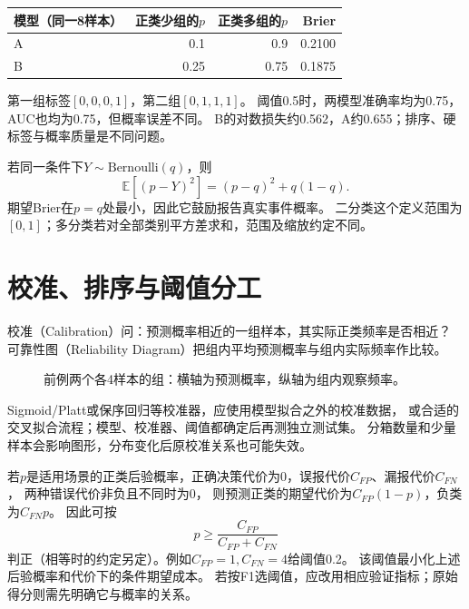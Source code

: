 \begin{center}
\begin{tabular}{lrrr}
\toprule
模型（同一8样本） & 正类少组的$p$ & 正类多组的$p$ & Brier\\
\midrule
A & 0.1 & 0.9 & 0.2100\\
B & 0.25 & 0.75 & 0.1875\\
\bottomrule
\end{tabular}
\end{center}
第一组标签$[0,0,0,1]$，第二组$[0,1,1,1]$。
阈值0.5时，两模型准确率均为0.75，AUC也均为0.75，但概率误差不同。
B的对数损失约0.562，A约0.655；排序、硬标签与概率质量是不同问题。

若同一条件下$Y\sim\mathrm{Bernoulli}(q)$，则
\[
 \mathbb E[(p-Y)^2]=(p-q)^2+q(1-q).
\]
期望Brier在$p=q$处最小，因此它鼓励报告真实事件概率。
二分类这个定义范围为$[0,1]$；多分类若对全部类别平方差求和，范围及缩放约定不同。


\section{校准、排序与阈值分工}
\label{sec:diag-calibration}
校准（Calibration）问：预测概率相近的一组样本，其实际正类频率是否相近？
可靠性图（Reliability Diagram）把组内平均预测概率与组内实际频率作比较。

\begin{figure}[htbp]
\centering
\caption{前例两个各4样本的组：横轴为预测概率，纵轴为组内观察频率。}
\par\smallskip
{}
\end{figure}

Sigmoid/Platt或保序回归等校准器，应使用模型拟合之外的校准数据，
或合适的交叉拟合流程；模型、校准器、阈值都确定后再测独立测试集。
分箱数量和少量样本会影响图形，分布变化后原校准关系也可能失效。

若$p$是适用场景的正类后验概率，正确决策代价为0，误报代价$C_{FP}$、漏报代价$C_{FN}$，
两种错误代价非负且不同时为0，
则预测正类的期望代价为$C_{FP}(1-p)$，负类为$C_{FN}p$。
因此可按
\[
 p\geq\frac{C_{FP}}{C_{FP}+C_{FN}}
\]
判正（相等时的约定另定）。例如$C_{FP}=1,C_{FN}=4$给阈值0.2。
该阈值最小化上述后验概率和代价下的条件期望成本。
若按F1选阈值，应改用相应验证指标；原始得分则需先明确它与概率的关系。

